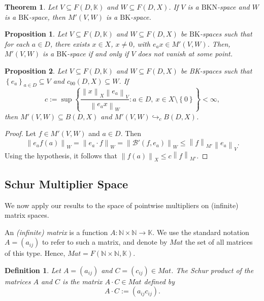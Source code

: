 \documentclass[14pt, a4paper]{article}  %
\providecommand{\llave}[1]{\left\lbrace #1\right\rbrace }
\providecommand{\pare}[1]{\left( #1\right) }
\providecommand{\norm}[1]{\left\lVert#1\right\rVert}
\newcommand{\tien}{\rightarrow}
\newcommand{\K}{\mathbb{K}}
\newcommand{\N}{\mathbb{N}}
\newcommand{\BK}{\text{BK}}
\newcommand{\BKa}{\text{BKN}}
\newcommand{\BB}{\mathscr{B}}
\newcommand{\Mt}{M'}
\newtheorem{proposition}{Proposition}[section]
\newtheorem{theorem}{Theorem}[section]
\newtheorem{definition}{Definition}[section]
\begin{document}
\begin{theorem}\label{piz27_1_0} Let $V \subseteq F\pare{D, \K}$ and $W \subseteq F\pare{D, X}$. If $V$ is a $\BKa$-space  and $W$ is a $\BK$-space, then $\Mt\pare{V, W}$ is a $\BK$-space.
\end{theorem}

\begin{proposition} \label{d343_nu_0} 
	Let $V \subseteq F\pare{D, \K}$ and $W \subseteq F\pare{D, X}$ be $\BK$-spaces such that for each $a \in D$, there exists $x \in X$, $x \neq 0$, with $e_{a}x \in \Mt\pare{V, W}$. Then, $\Mt\pare{V, W}$ is a $\BK$-space if and only if $V$ does not vanish at some point.
\end{proposition}

\begin{proposition}\label{final2}
	Let $V \subseteq F\pare{D,\K}$ and $W \subseteq F\pare{D,X}$ be BK-spaces such that $\llave{e_{a}}_{a\in D}\subseteq V$ and $c_{00} (D,X) \subseteq  W$. If
	\begin{equation}
		c:=\sup\llave{\frac{\norm{x}_{X}\norm{e_{a}}_{V}}{\norm{e_{a}x}_{W}}:  a\in D,\ x\in X\setminus\llave{0}}<\infty,
	\end{equation}
	then $M'(V,W)\subseteq B\pare{D,X}$ and $M'(V,W)\hookrightarrow_{c}B\pare{D,X}$.
\end{proposition} 
\begin{proof}  Let $f\in M'(V,W)$ and $a\in D$. Then
	\begin{equation}
		\norm{e_{a}f\pare{a}}_{W}
		=
		\norm{e_{a}\cdot f}_{W}
		=
		\norm{\BB'\pare{f,e_{a}}}_{W}
		\leq
		\norm{f}_{M'}\norm{e_{a}}_{V}.
	\end{equation}
	Using the hypothesis, it follows that
	$
	\norm{f\pare{a}}_{X}\leq c\norm{f}_{M'}.
	$
\end{proof}

\subsection{Schur Multiplier Space}

We now apply our results to the space of pointwise multipliers on (infinite) matrix spaces.

An \emph{(infinite) matrix} is a function $A:\N\times \N\tien \K$.
We use the standard notation $A=\pare{a_{ij}}$ to refer to such a matrix, and denote by $Mat$ the set of all matrices of this type. Hence, $Mat=F\pare{\N\times \N,\K}$.

\begin{definition}
	Let $A=\pare{a_{ij}}$ and $C=\pare{c_{ij}}\in Mat $. The \emph{Schur product} of the matrices $A$ and $C$ is the matrix $A \cdot C\in Mat $ defined by
	\begin{equation}
		A\cdot C:=\pare{a_{ij}c_{ij}}.
	\end{equation}
\end{definition}
\end{document}
